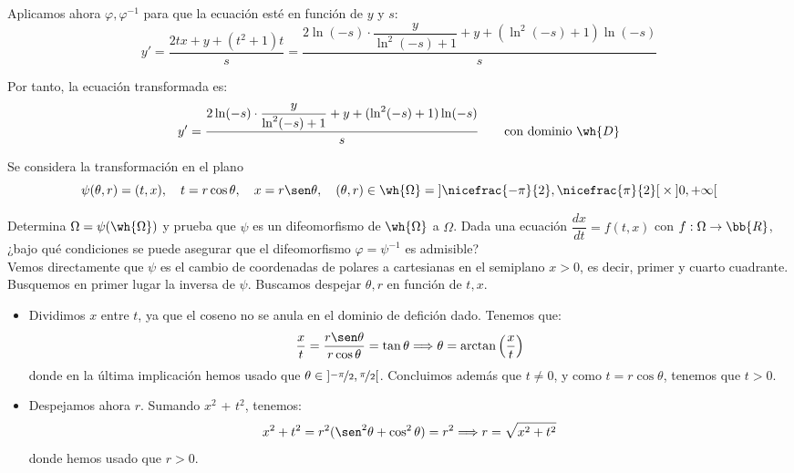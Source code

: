 \documentclass[12pt]{article}
\begin{document}
\begin{ejercicio}
    Aplicamos ahora $\varphi,\varphi^{-1}$ para que la ecuación esté en función de $y$ y $s$:
    \begin{equation*}
        y'= \dfrac{2tx+y+(t^2+1)t}{s} = \dfrac{2\ln(-s)\cdot \dfrac{y}{\ln^2(-s)+1}+y+(\ln^2(-s)+1)\ln(-s)}{s}
    \end{equation*}

    Por tanto, la ecuación transformada es:
    \begin{equation*}
        y' = \dfrac{2\ln(-s)\cdot \dfrac{y}{\ln^2(-s)+1}+y+(\ln^2(-s)+1)\ln(-s)}{s}\qquad \text{con dominio }\wh{D}
    \end{equation*}
\end{ejercicio}

\begin{ejercicio}
    Se considera la transformación en el plano
    \begin{equation*}
        \psi(\theta, r) = (t, x), \quad t = r\cos \theta, \quad x = r\sen \theta, \quad (\theta, r) \in \wh{\Omega} = \left]\nicefrac{-\pi}{2}, \nicefrac{\pi}{2}\right[ \times \left]0, +\infty\right[
    \end{equation*}

    Determina $\Omega = \psi(\wh{\Omega})$ y prueba que $\psi$ es un difeomorfismo de $\wh{\Omega}$ a $\Omega$. Dada una ecuación $\dfrac{dx}{dt} = f(t, x)$ con $f : \Omega \to \bb{R}$, ¿bajo qué condiciones se puede asegurar que el difeomorfismo $\varphi = \psi^{-1}$ es admisible?\\

    Vemos directamente que $\psi$ es el cambio de coordenadas de polares a cartesianas en el semiplano $x>0$, es decir, primer y cuarto cuadrante.
    Busquemos en primer lugar la inversa de $\psi$. Buscamos despejar $\theta, r$ en función de $t, x$.
    \begin{itemize}
        \item Dividimos $x$ entre $t$, ya que el coseno no se anula en el dominio de defición dado. Tenemos que:
        \begin{equation*}
            \dfrac{x}{t} = \dfrac{r\sen \theta}{r\cos \theta} = \tan \theta
            \Longrightarrow \theta = \arctan \left(\dfrac{x}{t}\right)
        \end{equation*}
        donde en la última implicación hemos usado que $\theta\in\left]\nicefrac{-\pi}{2}, \nicefrac{\pi}{2}\right[$.
        Concluimos además que $t\neq 0$, y como $t=r\cos \theta$, tenemos que $t>0$.

        \item Despejamos ahora $r$. Sumando $x^2$ + $t^2$, tenemos:
        \begin{equation*}
            x^2+t^2 = r^2(\sen^2 \theta + \cos^2 \theta) = r^2 \Longrightarrow r = \sqrt{x^2+t^2}
        \end{equation*}
        donde hemos usado que $r>0$.
    \end{itemize}


\end{ejercicio}
\end{document}
